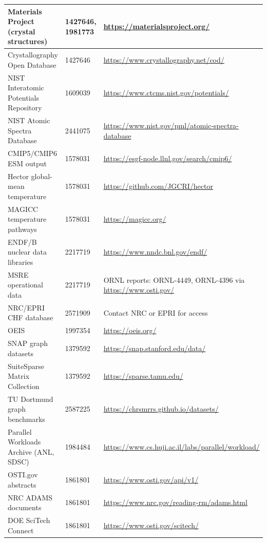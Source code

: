 \documentclass[11pt,a4paper]{article}
\begin{document}
\begin{longtable}{p{4.5cm} p{3cm} p{6.5cm}}
Materials Project (crystal structures) & 1427646, 1981773 & \url{https://materialsproject.org/} \\
\midrule
Crystallography Open Database & 1427646 & \url{https://www.crystallography.net/cod/} \\
\midrule
NIST Interatomic Potentials Repository & 1609039 & \url{https://www.ctcms.nist.gov/potentials/} \\
\midrule
NIST Atomic Spectra Database & 2441075 & \url{https://www.nist.gov/pml/atomic-spectra-database} \\
\midrule

CMIP5/CMIP6 ESM output & 1578031 & \url{https://esgf-node.llnl.gov/search/cmip6/} \\
\midrule
Hector global-mean temperature & 1578031 & \url{https://github.com/JGCRI/hector} \\
\midrule
MAGICC temperature pathways & 1578031 & \url{https://magicc.org/} \\
\midrule

ENDF/B nuclear data libraries & 2217719 & \url{https://www.nndc.bnl.gov/endf/} \\
\midrule
MSRE operational data & 2217719 & ORNL reports: ORNL-4449, ORNL-4396 via \url{https://www.osti.gov/} \\
\midrule
NRC/EPRI CHF database & 2571909 & Contact NRC or EPRI for access \\
\midrule

OEIS & 1997354 & \url{https://oeis.org/} \\
\midrule
SNAP graph datasets & 1379592 & \url{https://snap.stanford.edu/data/} \\
\midrule
SuiteSparse Matrix Collection & 1379592 & \url{https://sparse.tamu.edu/} \\
\midrule
TU Dortmund graph benchmarks & 2587225 & \url{https://chrsmrrs.github.io/datasets/} \\
\midrule

Parallel Workloads Archive (ANL, SDSC) & 1984484 & \url{https://www.cs.huji.ac.il/labs/parallel/workload/} \\
\midrule

OSTI.gov abstracts & 1861801 & \url{https://www.osti.gov/api/v1/} \\
\midrule
NRC ADAMS documents & 1861801 & \url{https://www.nrc.gov/reading-rm/adams.html} \\
\midrule
DOE SciTech Connect & 1861801 & \url{https://www.osti.gov/scitech/} \\
\midrule


\end{longtable}
\end{document}
